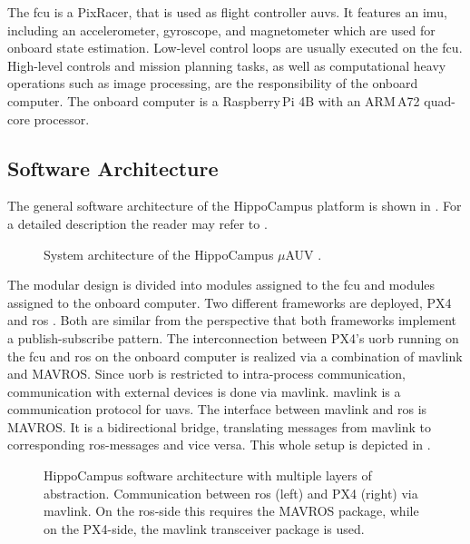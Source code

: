 The \ac{fcu} is a PixRacer, that is used as flight controller \acp{auv}. It features an \ac{imu}, including an accelerometer, gyroscope, and magnetometer which are used for onboard state estimation. Low-level control loops are usually executed on the \ac{fcu}. High-level controls and mission planning tasks, as well as computational heavy operations such as image processing, are the responsibility of the onboard computer. The onboard computer is a Raspberry\,Pi 4B with an ARM\,A72 quad-core processor.

\subsection{Software Architecture}
The general software architecture of the HippoCampus platform is shown in . 
For a detailed description the reader may refer to \cite{duecker-phd}. 
\begin{figure}
	\centering
     \def\svgwidth{12cm}  
	
	\caption{System architecture of the HippoCampus $\mu$AUV \cite{duecker-phd}.}
    \label{fig:software-architecture-overview}
\end{figure}
The modular design is divided into modules assigned to the \ac{fcu} and modules assigned to the onboard computer.
Two different frameworks are deployed, PX4 \cite{PX4} and \ac{ros} \cite{ros}.
Both are similar from the perspective that both frameworks implement a publish-subscribe pattern.
The interconnection between PX4's \ac{uorb} running on the \ac{fcu} and \ac{ros} on the onboard computer is realized via a combination of \ac{mavlink} \cite{mavlink} and MAVROS.
Since \ac{uorb} is restricted to intra-process communication, communication with external devices is done via \ac{mavlink}.
\ac{mavlink} is a communication protocol for \acp{uav}.
The interface between \ac{mavlink} and \ac{ros} is MAVROS. It is a bidirectional bridge, translating messages from \ac{mavlink} to corresponding \acs{ros}-messages and vice versa. This whole setup is depicted in .
\begin{figure}
	\centering
	
	\caption{HippoCampus software architecture with multiple layers of abstraction. Communication between \acs{ros} (left) and PX4 (right) via \acs{mavlink}. On the \acs{ros}-side this requires the MAVROS package, while on the PX4-side, the \acs{mavlink} transceiver package is used.}
    \label{fig:ros-px4-communication}
\end{figure}


